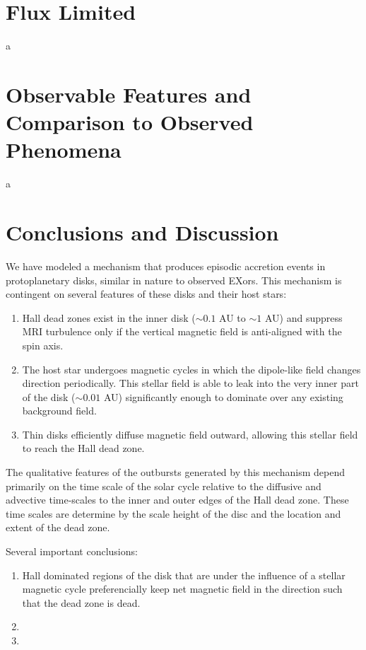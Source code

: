  
 
 

\section{Flux Limited}
a





\section{Observable Features and Comparison to Observed Phenomena}
a





\section{Conclusions and Discussion}
We have modeled a mechanism that produces episodic accretion events in protoplanetary disks, similar in nature to observed EXors.  This mechanism is contingent on several features of these disks and their host stars:
\begin{enumerate}
\item{Hall dead zones exist in the inner disk ($\sim 0.1$ AU to $\sim 1$ AU) and suppress MRI turbulence only if the vertical magnetic field is anti-aligned with the spin axis. }
\item{The host star undergoes magnetic cycles in which the dipole-like field changes direction periodically.  This stellar field is able to leak into the very inner part of the disk ($\sim 0.01$ AU) significantly enough to dominate over any existing background field.}
\item{Thin disks efficiently diffuse magnetic field outward, allowing this stellar field to reach the Hall dead zone.}
\end{enumerate}

The qualitative features of the outbursts generated by this mechanism depend primarily on the time scale of the solar cycle relative to the diffusive and advective time-scales to the inner and outer edges of the Hall dead zone.  These time scales are determine by the scale height of the disc and the location and extent of the dead zone.

Several important conclusions:
\begin{enumerate}
\item{Hall dominated regions of the disk that are under the influence of a stellar magnetic cycle preferencially keep net magnetic field in the direction such that the dead zone is dead.}
\item{}
\item{}
\end{enumerate}
















